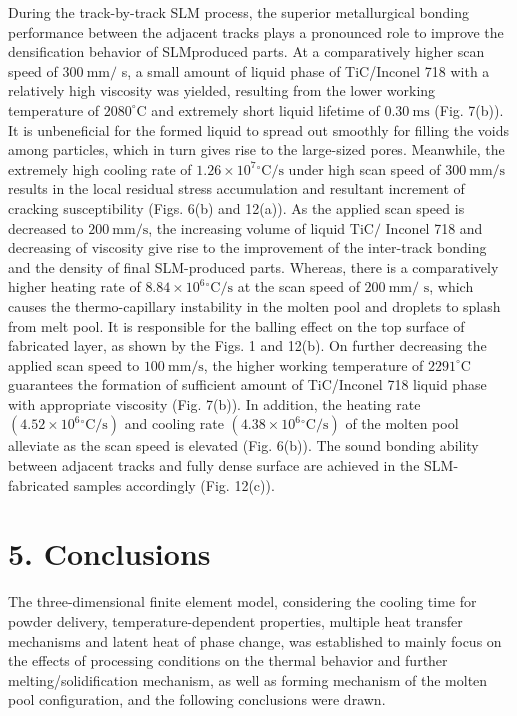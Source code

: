 \documentclass[10pt]{article}
\begin{document}
During the track-by-track SLM process, the superior metallurgical bonding performance between the adjacent tracks plays a pronounced role to improve the densification behavior of SLMproduced parts. At a comparatively higher scan speed of $300 \mathrm{~mm} /$ s, a small amount of liquid phase of TiC/Inconel 718 with a relatively high viscosity was yielded, resulting from the lower working temperature of $2080^{\circ} \mathrm{C}$ and extremely short liquid lifetime of $0.30 \mathrm{~ms}$ (Fig. 7(b)). It is unbeneficial for the formed liquid to spread out smoothly for filling the voids among particles, which in turn gives rise to the large-sized pores. Meanwhile, the extremely high cooling rate of $1.26 \times 10^{7}{ }^{\circ} \mathrm{C} / \mathrm{s}$ under high scan speed of $300 \mathrm{~mm} / \mathrm{s}$ results in the local residual stress accumulation and resultant increment of cracking susceptibility (Figs. 6(b) and 12(a)). As the applied scan speed is decreased to $200 \mathrm{~mm} / \mathrm{s}$, the increasing volume of liquid $\mathrm{TiC} /$ Inconel 718 and decreasing of viscosity give rise to the improvement of the inter-track bonding and the density of final SLM-produced parts. Whereas, there is a comparatively higher heating rate of $8.84 \times 10^{6}{ }^{\circ} \mathrm{C} / \mathrm{s}$ at the scan speed of $200 \mathrm{~mm} /$ $\mathrm{s}$, which causes the thermo-capillary instability in the molten pool and droplets to splash from melt pool. It is responsible for the balling effect on the top surface of fabricated layer, as shown by the Figs. 1 and 12(b). On further decreasing the applied scan speed to $100 \mathrm{~mm} / \mathrm{s}$, the higher working temperature of $2291^{\circ} \mathrm{C}$ guarantees the formation of sufficient amount of TiC/Inconel 718 liquid phase with appropriate viscosity (Fig. 7(b)). In addition, the heating rate $\left(4.52 \times 10^{6}{ }^{\circ} \mathrm{C} / \mathrm{s}\right)$ and cooling rate $\left(4.38 \times 10^{6}{ }^{\circ} \mathrm{C} / \mathrm{s}\right)$ of the molten pool alleviate as the scan speed is elevated (Fig. 6(b)). The sound bonding ability between adjacent tracks and fully dense surface are achieved in the SLM-fabricated samples accordingly (Fig. 12(c)).

\section*{5. Conclusions}
The three-dimensional finite element model, considering the cooling time for powder delivery, temperature-dependent properties, multiple heat transfer mechanisms and latent heat of phase change, was established to mainly focus on the effects of processing conditions on the thermal behavior and further melting/solidification mechanism, as well as forming mechanism of the molten pool configuration, and the following conclusions were drawn.
\end{document}
